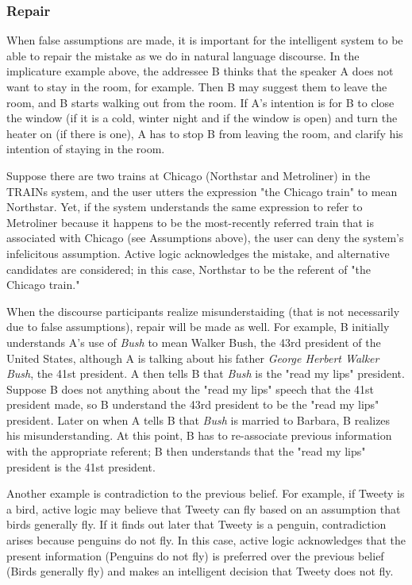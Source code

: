 \documentclass{article}
\begin{document}
\subsubsection{Repair}
When false assumptions are made, it is important for the intelligent
system to be able to repair the mistake as we do in natural language
discourse.  In the implicature example above, the addressee B thinks
that the speaker A does not want to stay in the room, for example.
Then B may suggest them to leave the room, and B starts walking out
from the room.  If A's intention is for B to close the
window (if it is a cold, winter night and if the window is open) and
turn the heater on (if there is one), A has to stop B from leaving the
room, and clarify his intention of staying in the room.

Suppose there are two trains at Chicago (Northstar and Metroliner) in the TRAINs system, and the user utters the expression "the Chicago train" to mean Northstar.  Yet, if the system understands the same expression to refer to Metroliner because it happens to be the most-recently referred train that is associated with Chicago (see Assumptions above), the user can deny the system's infelicitous assumption.  Active logic acknowledges the mistake, and alternative candidates are considered; in this case, Northstar to be the referent of "the Chicago train."

When the discourse participants realize misunderstaiding (that is not necessarily due to false assumptions), repair will be made as well.  For example, B initially understands A's use of {\em Bush} to mean {\George Walker Bush}, the 43rd president of the United States, although A is talking about his father {\em George Herbert Walker Bush}, the 41st president.  A then tells B that {\em Bush} is the "read my lips" president.  Suppose B does not anything about the "read my lips" speech that the 41st president made, so B understand the 43rd president to be the "read my lips" president.  Later on when A tells B that {\em Bush} is married to Barbara, B realizes his misunderstanding.  At this point, B has to re-associate previous information with the appropriate referent; B then understands that the "read my lips" president is the 41st president.  

Another example is contradiction to the previous belief.  For example, if Tweety is a bird, active logic may believe that Tweety can fly based on an assumption that birds generally fly.  If it finds out later that Tweety is a penguin, contradiction arises because penguins do not fly.  In this case, active logic acknowledges that the present information (Penguins do not fly) is preferred over the previous belief (Birds generally fly) and makes an intelligent decision that Tweety does not fly.
\end{document}
